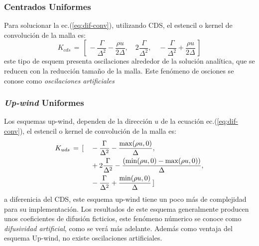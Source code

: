 \documentclass[9pt,technote,twoside,letterpaper,onecolumn]{IEEEtran}
\begin{document}
\begin{multicols}{2}
\subsubsection{Centrados Uniformes}
\label{sec:esq_centr}
Para solucionar la ec.(\ref{eq:dif-conv}), utilizando CDS, el estencil o kernel de convolución de la malla es:
\begin{equation}
  K_{cds}\,=\,[\,-\frac{\Gamma}{\Delta^2}-\frac{\rho u}{2\Delta},\quad 2\frac{\Gamma}{\Delta^2},\quad -\frac{\Gamma}{\Delta^2}+\frac{\rho u}{2\Delta}\,]
  \label{eq:Kcds}
\end{equation}
este tipo de esquem presenta oscilaciones alrededor de la solución analítica, que se reducen con la reducción tamaño de la malla. Este fenómeno de osciones se conose como \emph{oscilaciones artificiales}

\subsubsection{\emph{Up-wind} Uniformes}
\label{sec:esq_upwind}
Los esquemas up-wind, dependen de la dirección $u$ de la ecuación ec.(\ref{eq:dif-conv}), el estencil o kernel de convolución de la malla es:
\begin{align}
  K_{uds}\,=\,[&\quad -\frac{\Gamma}{\Delta^2}-\frac{\max(\rho u,0)}{\Delta},\notag\\
  &\quad +2\frac{\Gamma}{\Delta^2}-\frac{(\min(\rho u,0)-\max(\rho u,0))}{\Delta},\label{eq:Kuds}\\
  &\quad -\frac{\Gamma}{\Delta^2}+\frac{\min(\rho u,0)}{\Delta}\,]\notag
\end{align}
a diferenicia del CDS, este esquema up-wind tiene un poco más de complejidad para su implementación. Los resultados de este esquema generalmente producen unos coeficientes de difusión ficticios, este fenómeno númerico se conoce como \emph{difusividad artificial}, como se verá más adelante. Además como ventaja del esquema Up-wind, no existe oscilaciones artificiales.


\end{multicols}
\end{document}

